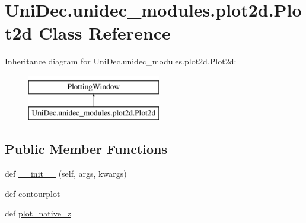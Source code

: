 \hypertarget{class_uni_dec_1_1unidec__modules_1_1plot2d_1_1_plot2d}{}\section{Uni\+Dec.\+unidec\+\_\+modules.\+plot2d.\+Plot2d Class Reference}
\label{class_uni_dec_1_1unidec__modules_1_1plot2d_1_1_plot2d}
Inheritance diagram for Uni\+Dec.\+unidec\+\_\+modules.\+plot2d.\+Plot2d\+:\begin{figure}[H]
\begin{center}
\leavevmode
\includegraphics[height=2.000000cm]{class_uni_dec_1_1unidec__modules_1_1plot2d_1_1_plot2d}
\end{center}
\end{figure}
\subsection*{Public Member Functions}
\begin{DoxyCompactItemize}
\item 
def \hyperlink{class_uni_dec_1_1unidec__modules_1_1plot2d_1_1_plot2d_ac66b98ae8813e973ed3d018bf6d81fd4}{\+\_\+\+\_\+init\+\_\+\+\_\+} (self, args, kwargs)
\item 
def \hyperlink{class_uni_dec_1_1unidec__modules_1_1plot2d_1_1_plot2d_ae38cd5ad1cd12fd0ef940a8345c1908d}{contourplot}
\item 
def \hyperlink{class_uni_dec_1_1unidec__modules_1_1plot2d_1_1_plot2d_ab7c669724727c37898f82d9fceef408a}{plot\+\_\+native\+\_\+z}
\end{DoxyCompactItemize}
